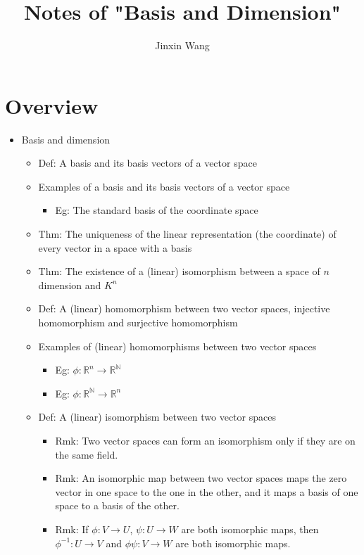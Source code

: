 \documentclass[onecolumn]{ctexart}
\title{Notes of "Basis and Dimension"}
\author{Jinxin Wang}
\date{}
\begin{document}
\maketitle

\section{Overview}
\begin{itemize}
  \item Basis and dimension
  \begin{itemize}
    \item Def: A basis and its basis vectors of a vector space
    \item Examples of a basis and its basis vectors of a vector space
    \begin{itemize}
      \item Eg: The standard basis of the coordinate space
    \end{itemize}
    \item Thm: The uniqueness of the linear representation (the coordinate) of every vector in a space with a basis
    \item Thm: The existence of a (linear) isomorphism between a space of $n$ dimension and $K^n$
    \item Def: A (linear) homomorphism between two vector spaces, injective homomorphism and surjective homomorphism
    \item Examples of (linear) homomorphisms between two vector spaces
    \begin{itemize}
      \item Eg: $\phi: \mathbb{R}^n \to \mathbb{R}^{\mathbb{N}}$
      \item Eg: $\phi: \mathbb{R}^{\mathbb{N}} \to \mathbb{R}^n$
    \end{itemize}
    \item Def: A (linear) isomorphism between two vector spaces
    \begin{itemize}
      \item Rmk: Two vector spaces can form an isomorphism only if they are on the same field.
      \item Rmk: An isomorphic map between two vector spaces maps the zero vector in one space to the one in the other, and it maps a basis of one space to a basis of the other.
      \item Rmk: If $\phi: V \to U$, $\psi: U \to W$ are both isomorphic maps, then $\phi^{-1}: U \to V$ and $\phi \psi: V \to W$ are both isomorphic maps.

\end{itemize}
\end{itemize}
\end{itemize}
\end{document}
